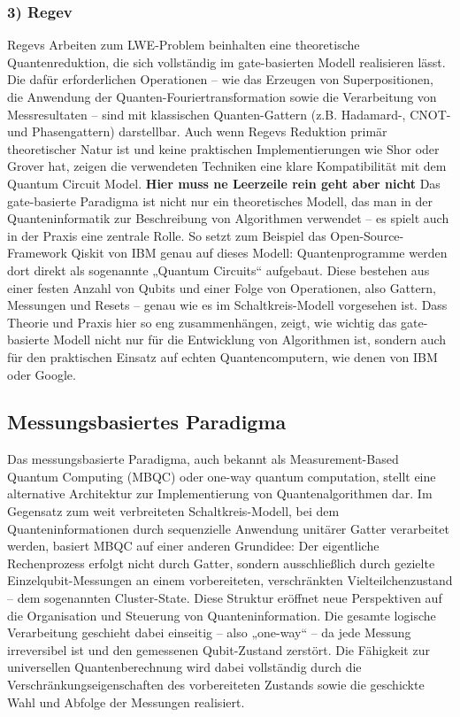 \subsubsection*{3) Regev}
Regevs Arbeiten zum LWE-Problem beinhalten eine theoretische Quantenreduktion, die sich vollständig im gate-basierten Modell realisieren lässt. Die dafür erforderlichen Operationen – wie das Erzeugen von Superpositionen, die Anwendung der Quanten-Fouriertransformation sowie die Verarbeitung von Messresultaten – sind mit klassischen Quanten-Gattern (z.B. Hadamard-, CNOT- und Phasengattern) darstellbar. Auch wenn Regevs Reduktion primär theoretischer Natur ist und keine praktischen Implementierungen wie Shor oder Grover hat, zeigen die verwendeten Techniken eine klare Kompatibilität mit dem Quantum Circuit Model.
\textbf{Hier muss ne Leerzeile rein geht aber nicht}
Das gate-basierte Paradigma ist nicht nur ein theoretisches Modell, das man in der Quanteninformatik zur Beschreibung von Algorithmen verwendet – es spielt auch in der Praxis eine zentrale Rolle. So setzt zum Beispiel das Open-Source-Framework Qiskit von IBM genau auf dieses Modell: Quantenprogramme werden dort direkt als sogenannte „Quantum Circuits“ aufgebaut. Diese bestehen aus einer festen Anzahl von Qubits und einer Folge von Operationen, also Gattern, Messungen und Resets – genau wie es im Schaltkreis-Modell vorgesehen ist.
Dass Theorie und Praxis hier so eng zusammenhängen, zeigt, wie wichtig das gate-basierte Modell nicht nur für die Entwicklung von Algorithmen ist, sondern auch für den praktischen Einsatz auf echten Quantencomputern, wie denen von IBM oder Google.

\subsection{Messungsbasiertes Paradigma}
Das messungsbasierte Paradigma, auch bekannt als Measurement-Based Quantum Computing (MBQC) oder one-way quantum computation, stellt eine alternative Architektur zur Implementierung von Quantenalgorithmen dar. Im Gegensatz zum weit verbreiteten Schaltkreis-Modell, bei dem Quanteninformationen durch sequenzielle Anwendung unitärer Gatter verarbeitet werden, basiert MBQC auf einer anderen Grundidee: Der eigentliche Rechenprozess erfolgt nicht durch Gatter, sondern ausschließlich durch gezielte Einzelqubit-Messungen an einem vorbereiteten, verschränkten Vielteilchenzustand – dem sogenannten Cluster-State.
Diese Struktur eröffnet neue Perspektiven auf die Organisation und Steuerung von Quanteninformation. Die gesamte logische Verarbeitung geschieht dabei einseitig – also „one-way“ – da jede Messung irreversibel ist und den gemessenen Qubit-Zustand zerstört. Die Fähigkeit zur universellen Quantenberechnung wird dabei vollständig durch die Verschränkungseigenschaften des vorbereiteten Zustands sowie die geschickte Wahl und Abfolge der Messungen realisiert.
